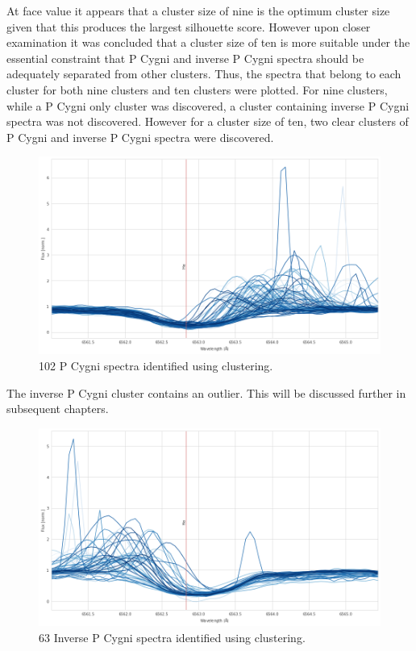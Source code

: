 At face value it appears that a cluster size of nine is the optimum cluster size given that this produces the largest silhouette score. However upon closer examination it was concluded that a cluster size of ten is more suitable under the essential constraint that P Cygni and inverse P Cygni spectra should be adequately separated from other clusters. Thus, the spectra that belong to each cluster for both nine clusters and ten clusters were plotted. For nine clusters, while a P Cygni only cluster was discovered, a cluster containing inverse P Cygni spectra was not discovered. However for a cluster size of ten, two clear clusters of P Cygni and inverse P Cygni spectra were discovered.

\begin{figure}[h]
\centering
\includegraphics[scale=0.45]{figures/pcygni.png}
\caption{102 P Cygni spectra identified using clustering.}
\end{figure}

The inverse P Cygni cluster contains an outlier. This will be discussed further in subsequent chapters.

\begin{figure}[h]
\centering
\includegraphics[scale=0.45]{figures/inverse p cygni.png}
\caption{63 Inverse P Cygni spectra identified using clustering.}
\end{figure}

